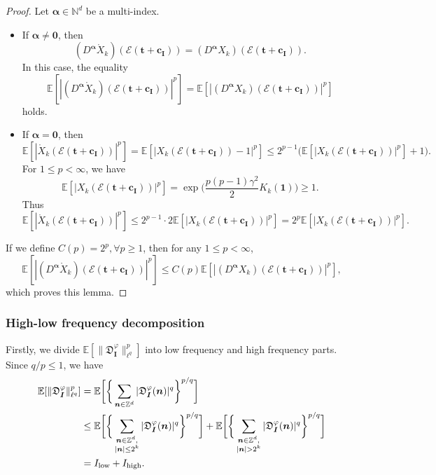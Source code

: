 \documentclass[12pt]{amsart}
\theoremstyle{definition}
\theoremstyle{remark}
\newcommand{\bt}{\boldsymbol{t}}
\newcommand{\N}{\mathbb{N}}
\newcommand{\Z}{\mathbb{Z}}
\newcommand{\E}{\mathbb{E}}
\numberwithin{equation}{section}
\begin{document}
\begin{proof}
Let $\boldsymbol{\alpha}\in \N^d$ be a multi-index.
\begin{itemize}
	\item If $\boldsymbol{\alpha}\ne \boldsymbol{0}$, then 
	\[
	(D^{\boldsymbol{\alpha}}\mathring{X}_k)(\mathcal{E}(\bt+\boldsymbol{c_I}))=(D^{\boldsymbol{\alpha}}X_k)(\mathcal{E}(\bt+\boldsymbol{c_I})).
	\]
	In this case, the equality
	\[
	\E[|(D^{\boldsymbol{\alpha}}\mathring{X}_k)(\mathcal{E}(\bt+\boldsymbol{c_I}))|^p]=\E[|(D^{\boldsymbol{\alpha}}X_k)(\mathcal{E}(\bt+\boldsymbol{c_I}))|^p]
	\]
	holds.
	\item  If $\boldsymbol{\alpha}=\boldsymbol{0}$, then 
	\[
	\E[|\mathring{X}_k(\mathcal{E}(\bt+\boldsymbol{c_I}))|^p]=\E[|X_k(\mathcal{E}(\bt+\boldsymbol{c_I}))-1|^p]\le 2^{p-1}\big(\E[|X_k(\mathcal{E}(\bt+\boldsymbol{c_I}))|^p]+1\big).
	\]
	For $1\le p<\infty$, we have
	\[
	\E[|X_k(\mathcal{E}(\bt+\boldsymbol{c_I}))|^p]=\exp\big(\frac{p(p-1)\gamma^2}{2}K_k(\boldsymbol{1})\big)\ge 1.
	\]
	Thus
	\[
	\E[|\mathring{X}_k(\mathcal{E}(\bt+\boldsymbol{c_I}))|^p]\le 2^{p-1}\cdot 2\E[|X_k(\mathcal{E}(\bt+\boldsymbol{c_I}))|^p]=2^p\E[|X_k(\mathcal{E}(\bt+\boldsymbol{c_I}))|^p].
	\]
\end{itemize}

If we define $C(p)=2^{p},\forall p\ge 1$, then for any $1\le p<\infty$,
\[
\E[|(D^{\boldsymbol{\alpha}}\mathring{X}_k)(\mathcal{E}(\bt+\boldsymbol{c_I}))|^p]\le C(p)\E[|(D^{\boldsymbol{\alpha}}X_k)(\mathcal{E}(\bt+\boldsymbol{c_I}))|^p],
\]
which proves this lemma.
\end{proof}

\subsubsection{High-low frequency decomposition}

Firstly, we divide $\E[\|\mathfrak{D}_{\boldsymbol{I}}^\varphi\|_{\ell^q}^p]$ into low frequency and high frequency parts. Since $q/p\le 1$, we have
\begin{align*}
\E[\|\mathfrak{D}_{\boldsymbol{I}}^\varphi\|_{\ell^q}^p]&=\E\bigg[\bigg\{\sum_{\boldsymbol{n}\in \Z^d} |\mathfrak{D}_{\boldsymbol{I}}^\varphi (\boldsymbol{n})|^q\bigg\}^{p/q}\bigg]\\
&\le \E\bigg[\bigg\{\sum_{\substack{\boldsymbol{n}\in \Z^d,\\|\boldsymbol{n}|\le 2^k}} |\mathfrak{D}_{\boldsymbol{I}}^\varphi (\boldsymbol{n})|^q\bigg\}^{p/q}\bigg]+\E\bigg[\bigg\{\sum_{\substack{\boldsymbol{n}\in \Z^d,\\|\boldsymbol{n}|>2^k}} |\mathfrak{D}_{\boldsymbol{I}}^\varphi (\boldsymbol{n})|^q\bigg\}^{p/q}\bigg]\\
&=I_{\textnormal{low}}+I_{\textnormal{high}}.
\end{align*}
\end{document}
